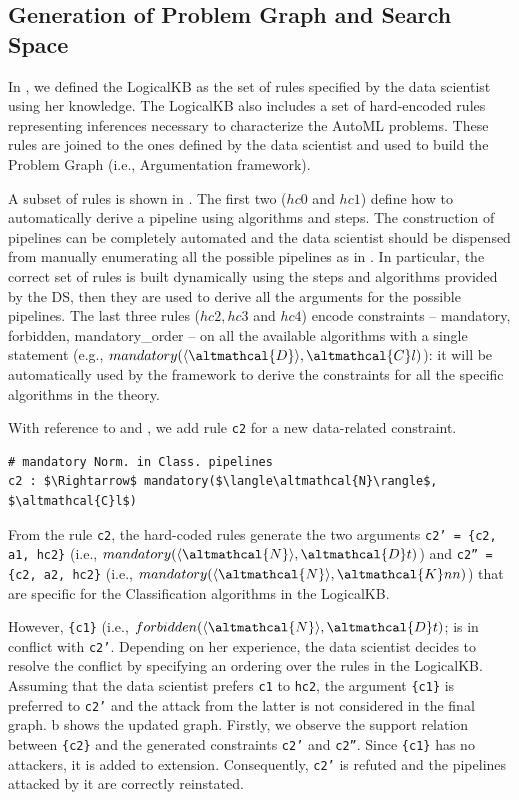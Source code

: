 \subsection{Generation of Problem Graph and Search Space}
In , we defined the LogicalKB as the set of rules specified by the data scientist using her knowledge.
The LogicalKB also includes a set of hard-encoded rules representing inferences necessary to characterize the AutoML problems.
These rules are joined to the ones defined by the data scientist and used to build the Problem Graph (i.e., Argumentation framework).

A subset of rules is shown in .
The first two ($hc0$ and $hc1$) define how to automatically derive a pipeline using algorithms and steps.
The construction of pipelines can be completely automated and the data scientist should be dispensed from manually enumerating all the possible pipelines as in .
In particular, the correct set of rules is built dynamically using the steps and algorithms provided by the DS, then they are used to derive all the arguments for the possible pipelines.
The last three rules ($hc2, hc3$ and $hc4$) encode constraints -- mandatory, forbidden, mandatory\_order -- on all the available algorithms with a single statement (e.g., $mandatory(\langle \altmathcal{D} \rangle, \altmathcal{C}l)$): it will be automatically used by the framework to derive the constraints for all the specific algorithms in the theory.

\begin{example}
With reference to  and , we add rule \texttt{c2} for a new data-related constraint.
\begin{lstlisting}[mathescape=true]
# mandatory Norm. in Class. pipelines
c2 : $\Rightarrow$ mandatory($\langle\altmathcal{N}\rangle$, $\altmathcal{C}l$)
\end{lstlisting}
From the rule \texttt{c2}, the hard-coded rules generate the two arguments
\texttt{c2' = \{c2, a1, hc2\}} (i.e., $mandatory(\langle\altmathcal{N}\rangle, \altmathcal{D}t)$) and \texttt{c2'' = \{c2, a2, hc2\}} (i.e., $mandatory(\langle\altmathcal{N}\rangle, \altmathcal{K}nn)$) that are specific for the Classification algorithms in the LogicalKB.

However, \texttt{\{c1\}} (i.e., $forbidden(\langle\altmathcal{N}\rangle, \altmathcal{D}t)$; is in conflict with \texttt{c2'}.
Depending on her experience, the data scientist decides to resolve the conflict by specifying an ordering over the rules in the LogicalKB.
Assuming that the data scientist prefers \texttt{c1} to \texttt{hc2},
the argument \texttt{\{c1\}} is preferred to \texttt{c2'} and the attack from the latter is not considered in the final graph.
b shows the updated graph.
Firstly, we observe the support relation between \texttt{\{c2\}} and the generated constraints \texttt{c2'} and \texttt{c2''}.
Since \texttt{\{c1\}} has no attackers, it is added to extension.
Consequently, \texttt{c2'} is refuted and the pipelines attacked by it are correctly reinstated.
\label{ex:hard_coded_rules}
\end{example}

